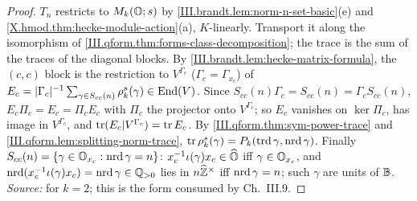 \begin{theorem}
\end{theorem}
\begin{proof}
$T_n$ restricts to $M_k(\mathbb{O};s)$ by \cref{III.brandt.lem:norm-n-set-basic}(e) and \cref{X.hmod.thm:hecke-module-action}(a), $K$-linearly. Transport it along
the isomorphism of \cref{III.qform.thm:forms-class-decomposition}; the trace is the sum of the traces of the diagonal blocks. By
\cref{III.brandt.lem:hecke-matrix-formula}, the $(c,c)$ block is the restriction to $V^{\Gamma_c}$ ($\Gamma_c=\Gamma_{x_c}$) of
$E_c=\lvert\Gamma_c\rvert^{-1}\sum_{\gamma\in S_{cc}(n)}\rho_k^s(\gamma)\in\operatorname{End}(V)$. Since $S_{cc}(n)\Gamma_c=S_{cc}(n)=\Gamma_cS_{cc}(n)$, $E_c\Pi_c=E_c=\Pi_cE_c$
with $\Pi_c$ the projector onto $V^{\Gamma_c}$; so $E_c$ vanishes on $\ker\Pi_c$, has image in $V^{\Gamma_c}$, and $\operatorname{tr}(E_c|V^{\Gamma_c})=\operatorname{tr} E_c$. By
\cref{III.qform.thm:sym-power-trace} and \cref{III.qform.lem:splitting-norm-trace}, $\operatorname{tr}\rho_k^s(\gamma)=P_k(\operatorname{trd}\gamma,\operatorname{nrd}\gamma)$. Finally
$S_{cc}(n)=\{\gamma\in\mathbb{O}_{x_c}:\operatorname{nrd}\gamma=n\}$: $x_c^{-1}\iota(\gamma)x_c\in\widehat{\mathbb{O}}$ iff $\gamma\in\mathbb{O}_{x_c}$, and $\operatorname{nrd}(x_c^{-1}\iota(\gamma)x_c)=\operatorname{nrd}\gamma\in\mathbb{Q}_{>0}$
lies in $n\widehat{\mathbb{Z}}^\times$ iff $\operatorname{nrd}\gamma=n$; such $\gamma$ are units of $\mathbb{B}$. \emph{Source:} \cite[(2.8), p.~359]{Piz} for $k=2$; this is the form
consumed by Ch.~III.9.
\end{proof}

